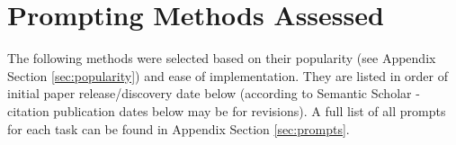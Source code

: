 \documentclass[11pt]{article}
\begin{document}

\section*{Prompting Methods Assessed}

The following methods were selected based on their popularity (see Appendix Section \ref{sec:popularity}) and ease of implementation. They are listed in order of initial paper release/discovery date below (according to Semantic Scholar - citation publication dates below may be for revisions). A full list of all prompts for each task can be found in Appendix Section \ref{sec:prompts}.
\end{document}

